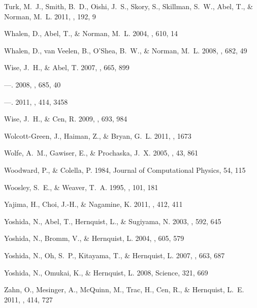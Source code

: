 \documentclass[apj]{emulateapj}
\begin{document}
\begin{thebibliography}{108}
{Turk}, M.~J., {Smith}, B.~D., {Oishi}, J.~S., {Skory}, S., {Skillman}, S.~W.,
  {Abel}, T., \& {Norman}, M.~L. 2011, \apjs, 192, 9

{Whalen}, D., {Abel}, T., \& {Norman}, M.~L. 2004, \apj, 610, 14

{Whalen}, D., {van Veelen}, B., {O'Shea}, B.~W., \& {Norman}, M.~L. 2008, \apj,
  682, 49

{Wise}, J.~H., \& {Abel}, T. 2007, \apj, 665, 899

---. 2008, \apj, 685, 40

---. 2011, \mnras, 414, 3458

{Wise}, J.~H., \& {Cen}, R. 2009, \apj, 693, 984

{Wolcott-Green}, J., {Haiman}, Z., \& {Bryan}, G.~L. 2011, \mnras, 1673

{Wolfe}, A.~M., {Gawiser}, E., \& {Prochaska}, J.~X. 2005, \araa, 43, 861

{Woodward}, P., \& {Colella}, P. 1984, Journal of Computational Physics, 54,
  115

{Woosley}, S.~E., \& {Weaver}, T.~A. 1995, \apjs, 101, 181

{Yajima}, H., {Choi}, J.-H., \& {Nagamine}, K. 2011, \mnras, 412, 411

{Yoshida}, N., {Abel}, T., {Hernquist}, L., \& {Sugiyama}, N. 2003, \apj, 592,
  645

{Yoshida}, N., {Bromm}, V., \& {Hernquist}, L. 2004, \apj, 605, 579

{Yoshida}, N., {Oh}, S.~P., {Kitayama}, T., \& {Hernquist}, L. 2007, \apj, 663,
  687

{Yoshida}, N., {Omukai}, K., \& {Hernquist}, L. 2008, Science, 321, 669

{Zahn}, O., {Mesinger}, A., {McQuinn}, M., {Trac}, H., {Cen}, R., \&
  {Hernquist}, L.~E. 2011, \mnras, 414, 727

\end{thebibliography}
\end{document}
